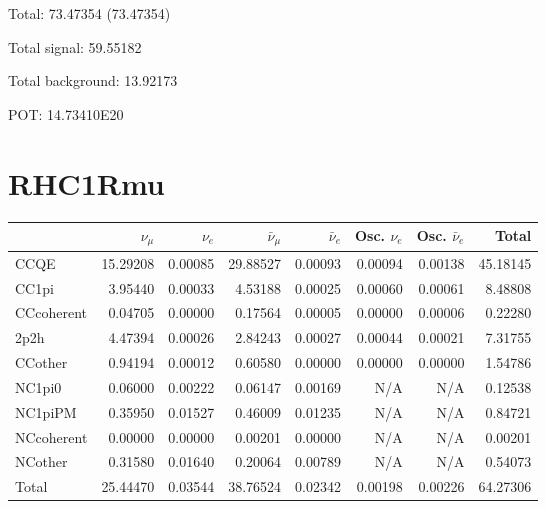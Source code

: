 \documentclass[10pt,a4paper]{article}
\begin{document}
Total: 73.47354    (73.47354)


Total signal: 59.55182


Total background: 13.92173

POT: 14.73410E20



\clearpage


\section*{RHC1Rmu}
\begin{tabular} { | l ||r | r | r | r | r | r | | r | }
\hline
              & $\nu_\mu$            & $\nu_e$              & $\bar{\nu}_{\mu}$    & $\bar{\nu}_{e}$      & Osc. $\nu_e$         & Osc. $\bar{\nu}_{e}$ & Total                \\ \hline\hline
 CCQE         & 15.29208             & 0.00085              & 29.88527             & 0.00093              & 0.00094              & 0.00138              & 45.18145             \\ \hline
 CC1pi        & 3.95440              & 0.00033              & 4.53188              & 0.00025              & 0.00060              & 0.00061              & 8.48808              \\ \hline
 CCcoherent   & 0.04705              & 0.00000              & 0.17564              & 0.00005              & 0.00000              & 0.00006              & 0.22280              \\ \hline
 2p2h         & 4.47394              & 0.00026              & 2.84243              & 0.00027              & 0.00044              & 0.00021              & 7.31755              \\ \hline
 CCother      & 0.94194              & 0.00012              & 0.60580              & 0.00000              & 0.00000              & 0.00000              & 1.54786              \\ \hline
 NC1pi0       & 0.06000              & 0.00222              & 0.06147              & 0.00169              & N/A                  & N/A                  & 0.12538              \\ \hline
 NC1piPM      & 0.35950              & 0.01527              & 0.46009              & 0.01235              & N/A                  & N/A                  & 0.84721              \\ \hline
 NCcoherent   & 0.00000              & 0.00000              & 0.00201              & 0.00000              & N/A                  & N/A                  & 0.00201              \\ \hline
 NCother      & 0.31580              & 0.01640              & 0.20064              & 0.00789              & N/A                  & N/A                  & 0.54073              \\ \hline
\hline
 Total        & 25.44470             & 0.03544              & 38.76524             & 0.02342              & 0.00198              & 0.00226              & 64.27306             \\ \hline

\end{tabular}
\end{document}
